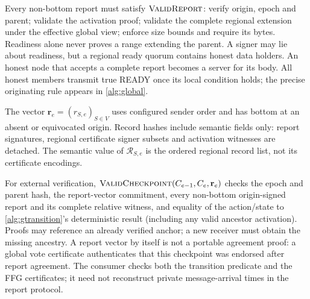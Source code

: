 \documentclass[11pt,a4paper,onecolumn]{article}
\newcommand{\Proc}[1]{\textnormal{\textsc{#1}}}
\theoremstyle{remark}\newtheorem{example}[definition]{Example}
\newcounter{protocol}
\begin{document}
Every non-bottom report must satisfy $\Proc{ValidReport}$: verify origin,
epoch and parent; validate the activation proof; validate the complete regional
extension under the effective global view; enforce size bounds and require its
bytes. Readiness alone never proves a range extending the parent. A signer may
lie about readiness, but a regional ready quorum contains honest data holders.
An honest node that accepts a complete report becomes a server for its body.
All honest members transmit true READY once its local condition holds; the
precise originating rule appears in \cref{alg:global}.

The vector $\mathbf r_e=(r_{S,e})_{S\in V}$ uses configured sender order and
has bottom at an absent or equivocated origin. Record hashes include semantic
fields only: report signatures, regional certificate signer subsets and
activation witnesses are detached. The semantic value of $\mathcal R_{S,e}$
is the ordered regional record list, not its certificate encodings.

For external verification, $\Proc{ValidCheckpoint}(C_{e-1},C_e,\mathbf r_e)$
checks the epoch and parent hash, the report-vector commitment, every non-bottom
origin-signed report and its complete relative witness, and equality of the
action/state to \cref{alg:gtransition}'s deterministic result (including any
valid ancestor activation). Proofs may reference an already verified anchor;
a new receiver must obtain the missing ancestry. A report vector by itself is
not a portable agreement proof: a global vote certificate authenticates that
this checkpoint was endorsed after report agreement. The consumer checks both
the transition predicate and the FFG certificates; it need not reconstruct
private message-arrival times in the report protocol.
\end{document}
